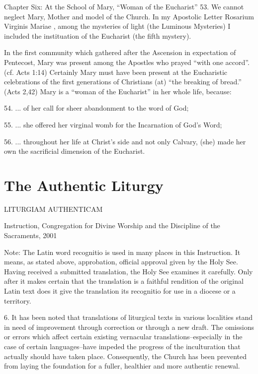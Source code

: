 \documentclass[oneside]{book}
\begin{document}
Chapter Six: At the School of Mary, ``Woman of the Eucharist''
53. We cannot neglect Mary, Mother and model of the Church. In my Apostolic
Letter Rosarium Virginis Mariae , among the mysteries of light (the Luminous
Mysteries) I included the instituation of the Eucharist (the fifth mystery).

 In the first community which gathered after the Ascension in expectation of
 Pentecost, Mary was present among the Apostles who prayed ``with one
 accord''. (cf. Acts 1:14) Certainly Mary must have been present at the
 Eucharistic celebrations of the first generations of Christians (at) ``the
 breaking of bread.'' (Acts  2,42)  Mary is a ``woman of the Eucharist'' in her
 whole life, because:

54. ... of her call for sheer abandonment to the word of God;

55. ... she offered her virginal womb for the Incarnation of God's Word;

56. ... throughout her life at Christ's side and not only Calvary, (she) made
her own the sacrificial dimension of the Eucharist.


\chapter{The Authentic Liturgy}

LITURGIAM AUTHENTICAM

Instruction, Congregation for Divine Worship and
  the Discipline of the Sacraments, 2001


Note: The Latin word recognitio is used in many places in this Instruction. It
means, as stated above, approbation, official approval given by the Holy
See. Having received a submitted translation, the Holy See examines it
carefully. Only after it makes certain that the translation is a faithful
rendition of the original Latin text does it give the translation its recognitio
for use in a diocese or a territory.

6. It has been noted that translations of liturgical texts in various localities
stand in need of improvement through correction or through a new draft. The
omissions or errors which affect certain existing vernacular
translations--especially in the case of certain languages--have impeded the
progress of the inculturation that actually should have taken
place. Consequently, the Church has been prevented from laying the foundation
for a fuller, healthier and more authentic renewal.
\end{document}
